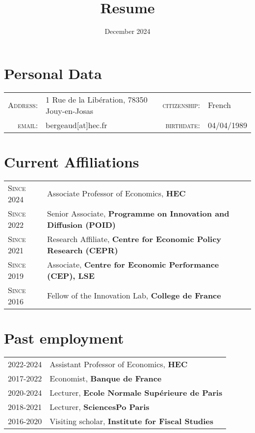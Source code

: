 \documentclass[12pt]{article}
\begin{document}
\title{\textbf{Resume}}
\date{December 2024}
\maketitle
\section*{Personal Data}

\begin{tabular}{r l r l }
    \textsc{Address:}   & 1 Rue de la Libération, 78350 Jouy-en-Josas  & \textsc{citizenship:} & French \\
    \textsc{email:}     & bergeaud[at]hec.fr &     \textsc{birthdate:} & 04/04/1989 \\ 
\end{tabular}

\section*{Current Affiliations}
\begin{tabular}{p{3cm}l}

\textsc{Since 2024} & Associate Professor of Economics, \textbf{HEC} \\
\textsc{Since 2022} & Senior Associate, \textbf{Programme on Innovation and Diffusion 
 (POID)} \\
\textsc{Since 2021} & Research Affiliate, \textbf{Centre for Economic Policy Research (CEPR)} \\
\textsc{Since 2019} & Associate, \textbf{Centre for Economic Performance (CEP), LSE} \\
\textsc{Since 2016} & Fellow of the Innovation Lab, \textbf{College de France} \\
\end{tabular}

\section*{Past employment}

\begin{tabular}{p{3cm}l}
\textsc{2022-2024} & Assistant Professor of Economics, \textbf{HEC} \\
\textsc{2017-2022} & Economist, \textbf{Banque de France} \\
\textsc{2020-2024} & Lecturer, \textbf{Ecole Normale Supérieure de Paris} \\
\textsc{2018-2021} & Lecturer, \textbf{SciencesPo Paris} \\
\textsc{2016-2020} & Visiting scholar, \textbf{Institute for Fiscal Studies}
\end{tabular}
\end{document}
